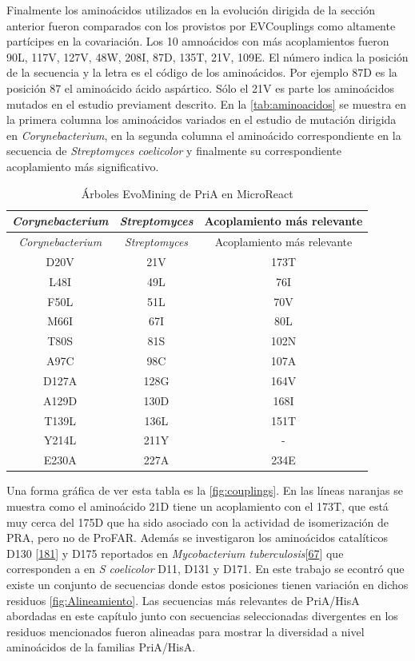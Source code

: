 \documentclass[12pt,twoside]{reedthesis}
\begin{document}
  Finalmente los aminoácidos utilizados en la evolución dirigida de la
  sección anterior fueron comparados con los provistos por EVCouplings
  como altamente partícipes en la covariación. Los 10 amnoácidos con más
  acoplamientos fueron 90L, 117V, 127V, 48W, 208I, 87D, 135T, 21V, 109E.
  El número indica la posición de la secuencia y la letra es el código de
  los aminoácidos. Por ejemplo 87D es la posición 87 el aminoácido ácido
  aspártico. Sólo el 21V es parte los aminoácidos mutados en el estudio
  previament descrito. En la \autoref{tab:aminoacidos} se muestra en la
  primera columna los aminoácidos variados en el estudio de mutación
  dirigida en \emph{Corynebacterium}, en la segunda columna el aminoácido
  correspondiente en la secuencia de \emph{Streptomyces coelicolor} y
  finalmente su correspondiente acoplamiento más significativo.\\
  
  \begin{longtable}[]{@{}ccc@{}}
  \caption{Árboles EvoMining de PriA en MicroReact
  \label{tab:aminoacidos}}\tabularnewline
  \toprule
  \emph{Corynebacterium} & \emph{Streptomyces} & Acoplamiento más
  relevante\tabularnewline
  \midrule
  \endfirsthead
  \toprule
  \emph{Corynebacterium} & \emph{Streptomyces} & Acoplamiento más
  relevante\tabularnewline
  \midrule
  \endhead
  D20V & 21V & 173T\tabularnewline
  L48I & 49L & 76I\tabularnewline
  F50L & 51L & 70V\tabularnewline
  M66I & 67I & 80L\tabularnewline
  T80S & 81S & 102N\tabularnewline
  A97C & 98C & 107A\tabularnewline
  D127A & 128G & 164V\tabularnewline
  A129D & 130D & 168I\tabularnewline
  T139L & 136L & 151T\tabularnewline
  Y214L & 211Y & -\tabularnewline
  E230A & 227A & 234E\tabularnewline
  \bottomrule
  \end{longtable}
  
  Una forma gráfica de ver esta tabla es la \autoref{fig:couplings}. En
  las líneas naranjas se muestra como el aminoácido 21D tiene un
  acoplamiento con el 173T, que está muy cerca del 175D que ha sido
  asociado con la actividad de isomerización de PRA, pero no de ProFAR.
  Además se investigaron los aminoácidos catalíticos D130
  {[}\protect\hyperlink{ref-due_bisubstrate_2011}{181}{]} y D175
  reportados en \emph{Mycobacterium
  tuberculosis}{[}\protect\hyperlink{ref-verduzco-castro_co-occurrence_2016}{67}{]}
  que corresponden a en \emph{S coelicolor} D11, D131 y D171. En este
  trabajo se econtró que existe un conjunto de secuencias donde estos
  posiciones tienen variación en dichos residuos
  \autoref{fig:Alineamiento}. Las secuencias más relevantes de PriA/HisA
  abordadas en este capítulo junto con secuencias seleccionadas
  divergentes en los residuos mencionados fueron alineadas para mostrar la
  diversidad a nivel aminoácidos de la familias PriA/HisA.
  
\end{document}
